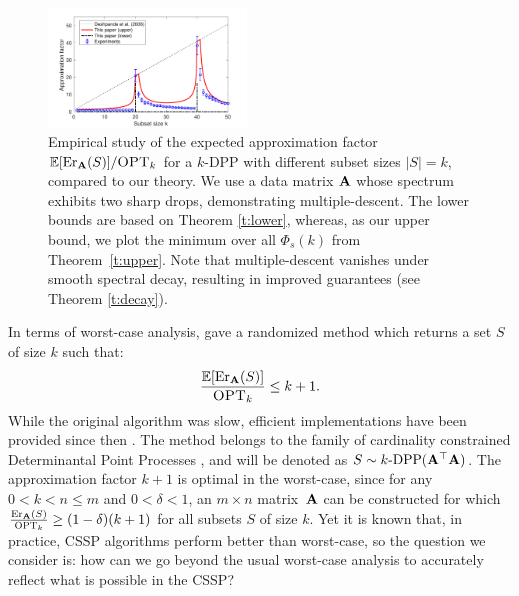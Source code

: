 \documentclass{article}
\begin{document}
\begin{figure}
  \centering  
  \includegraphics[width=0.47\textwidth]{figs/nystrom/nystrom-bounds}
  \caption{Empirical study of the
    expected approximation factor $\mathbb E[\mathrm{Er}_\mathbf A(S)]/{\textsc{OPT}_k}$ for
a $k$-DPP with
    different subset sizes $|S|=k$, compared to our theory. We use a
    data matrix $\mathbf A$ 
    whose
    spectrum exhibits two sharp drops, demonstrating
multiple-descent. The lower bounds are based on Theorem
    \ref{t:lower}, whereas, as our upper bound, we plot the
    minimum over all $\Phi_s(k)$ from
    Theorem~\ref{t:upper}. Note that multiple-descent vanishes under
    smooth spectral decay, resulting in improved guarantees (see
    Theorem \ref{t:decay}).
  }
  \label{f:intro}
  \end{figure}

In terms of worst-case analysis, 
\citet{pca-volume-sampling} gave a randomized
method 
which returns a
set $S$ of size $k$ such that: %
\begin{align}
  \frac{\mathbb E[\mathrm{Er}_\mathbf A(S)]}{{\textsc{OPT}_k}}\leq k+1.\label{eq:old-bound}
\end{align}
While the original algorithm was slow, 
efficient implementations have been provided since then
\citep[e.g., see][]{efficient-volume-sampling,dpp-intermediate}.
The method belongs to the family of cardinality constrained
Determinantal Point Processes \citep[DPPs, see][]{dpps-in-randnla}, and will
be denoted as $S\sim k\text{-}{\mathrm{DPP}}(\mathbf A^\top\mathbf A)$. 
The approximation  factor  $k+1$ is optimal in the worst-case,
since for any $0<k<n\leq m$ and $0<\delta<1$, an $m\times n$
matrix~$\mathbf A$ can be constructed for which $\frac{\mathrm{Er}_{\mathbf A}(S)}{{\textsc{OPT}_k}}\geq
(1-\delta)(k+1)$ for all subsets $S$ of size $k$. 
Yet it is known that, in practice, CSSP algorithms perform better
than worst-case, so the question we consider is: how can we go beyond
the usual worst-case analysis to accurately reflect what is possible
in the CSSP?  
\end{document}
